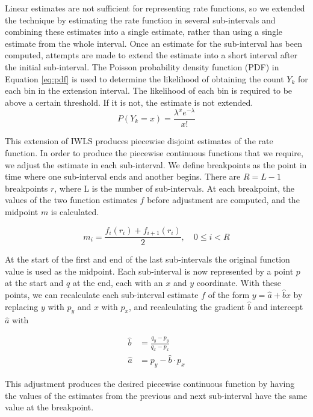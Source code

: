 \documentclass[11pt]{article}
\begin{document}
   Linear estimates are not sufficient for representing rate functions, so we
   extended the technique by estimating the rate function in several
   sub-intervals and combining these estimates into a single estimate, rather
   than using a single estimate from the whole interval. Once an estimate for
   the sub-interval has been computed, attempts are made to extend the estimate
   into a short interval after the initial sub-interval. The Poisson probability
   density function (PDF) in Equation \ref{eq:pdf} is used to determine the
   likelihood of obtaining the count $Y_k$ for each bin in the extension
   interval. The likelihood of each bin is required to be above a certain
   threshold. If it is not, the estimate is not extended.
    \begin{equation}
    \label{eq:pdf}
    P(Y_k=x)=\frac{\lambda^xe^{-\lambda}}{x!}
    \end{equation}
    
    This extension of IWLS produces piecewise disjoint estimates of the rate
    function. In order to produce the piecewise continuous functions that we
    require, we adjust the estimate in each sub-interval. We define breakpoints
    as the point in time where one sub-interval ends and another begins. There
    are $R=L-1$ breakpoints $r$, where L is the number of sub-intervals. At each
    breakpoint, the values of the two function estimates $f$ before adjustment
    are computed, and the midpoint $m$ is calculated.

    \begin{equation} 
    m_i = \frac{f_{i}(r_i) + f_{i+1}(r_i)}{2},\quad 0\leq i < R
    \end{equation}

    At the start of the first and end of the last sub-intervals the original
    function value is used as the midpoint. Each sub-interval is now represented
    by a point $p$ at the start and $q$ at the end, each with an $x$ and $y$
    coordinate. With these points, we can recalculate each sub-interval estimate
    $f$ of the form $y=\hat{a}+\hat{b}x$ by replacing $y$ with $p_y$ and $x$
    with $p_x$, and recalculating the gradient $\hat{b}$ and intercept $\hat{a}$
    with

    \begin{align} 
    \hat{b} &= \frac{q_y-p_y}{q_x-p_x}\\
    \hat{a} &= p_y - \hat{b}\cdot p_x 
    \end{align}

    This adjustment produces the desired piecewise continuous function by having
    the values of the estimates from the previous and next sub-interval have the
    same value at the breakpoint.
\end{document}
